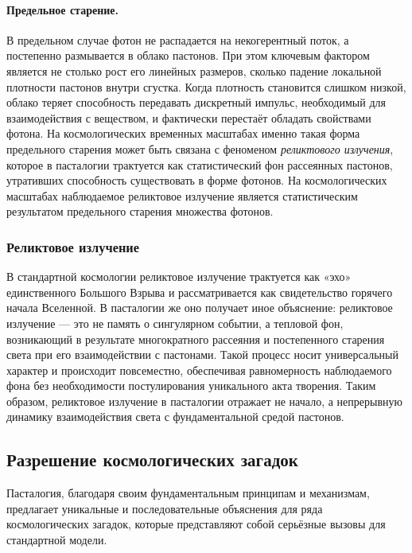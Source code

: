 \documentclass[pdflatex,sn-mathphys-num]{sn-jnl}
\begin{document}
\paragraph{Предельное старение.}
В предельном случае фотон не распадается на некогерентный поток, а постепенно размывается в облако пастонов. При этом ключевым фактором является не столько рост его линейных размеров, сколько падение локальной плотности пастонов внутри сгустка. Когда плотность становится слишком низкой, облако теряет способность передавать дискретный импульс, необходимый для взаимодействия с веществом, и фактически перестаёт обладать свойствами фотона. На космологических временных масштабах именно такая форма предельного старения может быть связана с феноменом \emph{реликтового излучения}, которое в пасталогии трактуется как статистический фон рассеянных пастонов, утративших способность существовать в форме фотонов. На космологических масштабах наблюдаемое реликтовое излучение является статистическим результатом предельного старения множества фотонов.

\subsubsection*{Реликтовое излучение}\label{subsubsec:relic-radiation}
В стандартной космологии реликтовое излучение трактуется как «эхо» единственного Большого Взрыва \cite{alpher1948-bigbang, penzias1965-cmb} и рассматривается как свидетельство горячего начала Вселенной.
В пасталогии же оно получает иное объяснение: реликтовое излучение — это не память о сингулярном событии, а тепловой фон, возникающий в результате многократного рассеяния и постепенного старения света при его взаимодействии с пастонами.
Такой процесс носит универсальный характер и происходит повсеместно, обеспечивая равномерность наблюдаемого фона без необходимости постулирования уникального акта творения.
Таким образом, реликтовое излучение в пасталогии отражает не начало, а непрерывную динамику взаимодействия света с фундаментальной средой пастонов.

\subsection{Разрешение космологических загадок}\label{subsec:cosmological-solutions}

Пасталогия, благодаря своим фундаментальным принципам и механизмам, предлагает уникальные и последовательные объяснения для ряда космологических загадок, которые представляют собой серьёзные вызовы для стандартной модели.
\end{document}
